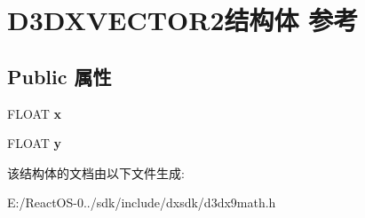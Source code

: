 \hypertarget{struct_d3_d_x_v_e_c_t_o_r2}{}\section{D3\+D\+X\+V\+E\+C\+T\+O\+R2结构体 参考}
\label{struct_d3_d_x_v_e_c_t_o_r2}
\subsection*{Public 属性}
\begin{DoxyCompactItemize}
\item 
\mbox{\label{struct_d3_d_x_v_e_c_t_o_r2_a44ff376cdd7e380d07566a70b91f298f}} 
F\+L\+O\+AT {\bfseries x}
\item 
\mbox{\label{struct_d3_d_x_v_e_c_t_o_r2_af8bb7145c6c62904fd4a007dabea7930}} 
F\+L\+O\+AT {\bfseries y}
\end{DoxyCompactItemize}


该结构体的文档由以下文件生成\+:\begin{DoxyCompactItemize}
\item 
E\+:/\+React\+O\+S-\/0../sdk/include/dxsdk/d3dx9math.\+h\end{DoxyCompactItemize}
